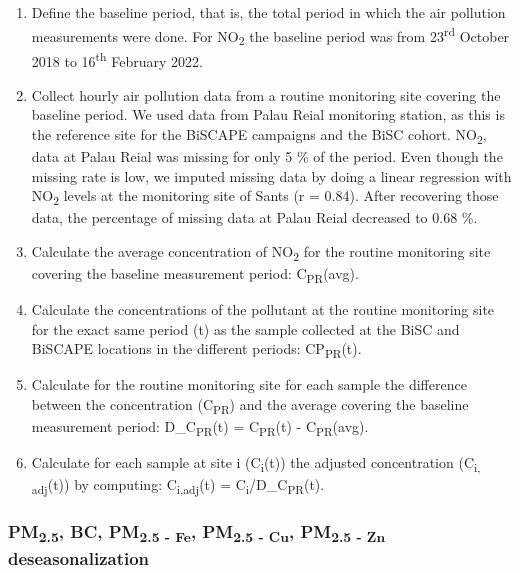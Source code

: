 \documentclass{article}
\begin{document}
\begin{enumerate}
    \item Define the baseline period, that is, the total period in which the air pollution measurements were done. For NO\textsubscript{2} the baseline period was from 23\textsuperscript{rd} October 2018 to 16\textsuperscript{th} February 2022.
    \item Collect hourly air pollution data from a routine monitoring site covering the baseline period. We used data from Palau Reial monitoring station, as this is the reference site for the BiSCAPE campaigns and the BiSC cohort. NO\textsubscript{2}, data at Palau Reial was missing for only 5 \% of the period. Even though the missing rate is low, we imputed missing data by doing a linear regression with NO\textsubscript{2} levels at the monitoring site of Sants (r = 0.84). After recovering those data, the percentage of missing data at Palau Reial decreased to 0.68 \%. 
    \item Calculate the average concentration of NO\textsubscript{2} for the routine monitoring site covering the baseline measurement period: C\textsubscript{PR}(avg).
    \item Calculate the concentrations of the pollutant at the routine monitoring site for the exact same period (t) as the sample collected at the BiSC and BiSCAPE locations in the different periods: CP\textsubscript{PR}(t). 
    \item Calculate for the routine monitoring site for each sample the difference between the concentration (C\textsubscript{PR}) and the average covering the baseline measurement period: D\_C\textsubscript{PR}(t) = C\textsubscript{PR}(t) - C\textsubscript{PR}(avg).
    \item Calculate for each sample at site i (C\textsubscript{i}(t)) the adjusted concentration (C\textsubscript{i, adj}(t)) by computing: C\textsubscript{i,adj}(t) = C\textsubscript{i}/D\_C\textsubscript{PR}(t).
\end{enumerate}

\subsubsection{PM\textsubscript{2.5}, BC, PM\textsubscript{2.5 - Fe}, PM\textsubscript{2.5 - Cu}, PM\textsubscript{2.5 - Zn} deseasonalization}
\end{document}
